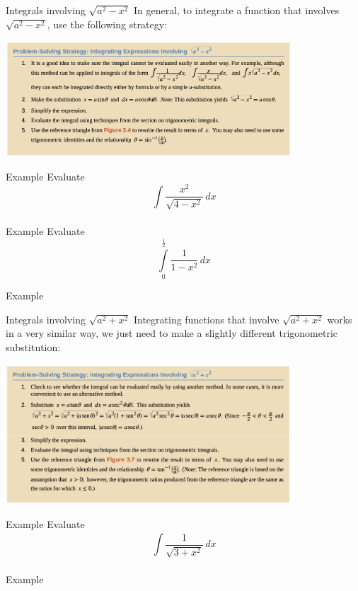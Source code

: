 \documentclass[presentation]{beamer}
\begin{document}
\begin{frame}[label={sec:org55e5046}]{Integrals involving \(\sqrt{a^2-x^2}\)}
In general, to integrate a function that involves \(\sqrt{a^2-x^2}\),
use the following strategy:
\begin{center}
\includegraphics[width=0.8\textwidth]{../img/trigSub1.png}
\end{center}
\end{frame}

\begin{frame}[label={sec:org415b5be}]{Example}
Evaluate
\[\int\limits_{}^{} \frac{x^2}{\sqrt{4-x^2}}\,dx \]
\vspace{10in}
\end{frame}

\begin{frame}[label={sec:org120ea72}]{Example}
Evaluate
\[
\int\limits_0^{\frac{1}{2}} \frac{1}{1-x^2}\,dx \]
\vspace{10in}
\end{frame}

\begin{frame}[label={sec:org0ead5af}]{Example}
\end{frame}

\begin{frame}[label={sec:org3c0208b}]{Integrals involving \(\sqrt{a^2+x^2}\)}
Integrating functions that involve \(\sqrt{a^2+x^2}\) works in a very
similar way, we just need to make a slightly different trigonometric
substitution:

\begin{center}
\includegraphics[width=0.8\textwidth]{../img/trigSub2f.png}
\end{center}
\end{frame}

\begin{frame}[label={sec:orga1d8898}]{Example}
Evaluate
\[
\int\limits_{}^{} \frac{1}{\sqrt{3+x^2}}\,dx \]
\vspace{10in}
\end{frame}

\begin{frame}[label={sec:orgc8b0c67}]{Example}
\end{frame}
\end{document}
